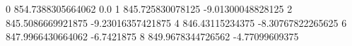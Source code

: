 0 854.7388305664062 0.0
1 845.725830078125 -9.01300048828125
2 845.5086669921875 -9.23016357421875
4 846.43115234375 -8.30767822265625
6 847.9966430664062 -6.7421875
8 849.9678344726562 -4.77099609375

